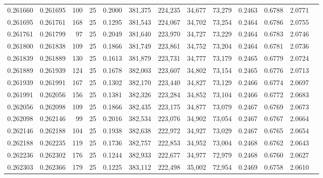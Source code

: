 \begin{tabular}{rrrrrrrrrrrrr}
0.261660 & 0.261695 &   100 &  25 &                                     0.2000 & 381,375 & 224,235 &  34,677 &  73,279 & 0.2463 & 0.6788 & 2.0771 \\
0.261695 & 0.261761 &   168 &  25 &                                     0.1295 & 381,543 & 224,067 &  34,702 &  73,254 & 0.2464 & 0.6786 & 2.0755 \\
0.261761 & 0.261799 &    97 &  25 &                                     0.2049 & 381,640 & 223,970 &  34,727 &  73,229 & 0.2464 & 0.6783 & 2.0746 \\
0.261800 & 0.261838 &   109 &  25 &                                     0.1866 & 381,749 & 223,861 &  34,752 &  73,204 & 0.2464 & 0.6781 & 2.0736 \\
0.261839 & 0.261889 &   130 &  25 &                                     0.1613 & 381,879 & 223,731 &  34,777 &  73,179 & 0.2465 & 0.6779 & 2.0724 \\
0.261889 & 0.261939 &   124 &  25 &                                     0.1678 & 382,003 & 223,607 &  34,802 &  73,154 & 0.2465 & 0.6776 & 2.0713 \\
0.261939 & 0.261991 &   167 &  25 &                                     0.1302 & 382,170 & 223,440 &  34,827 &  73,129 & 0.2466 & 0.6774 & 2.0697 \\
0.261991 & 0.262056 &   156 &  25 &                                     0.1381 & 382,326 & 223,284 &  34,852 &  73,104 & 0.2466 & 0.6772 & 2.0683 \\
0.262056 & 0.262098 &   109 &  25 &                                     0.1866 & 382,435 & 223,175 &  34,877 &  73,079 & 0.2467 & 0.6769 & 2.0673 \\
0.262098 & 0.262146 &    99 &  25 &                                     0.2016 & 382,534 & 223,076 &  34,902 &  73,054 & 0.2467 & 0.6767 & 2.0664 \\
0.262146 & 0.262188 &   104 &  25 &                                     0.1938 & 382,638 & 222,972 &  34,927 &  73,029 & 0.2467 & 0.6765 & 2.0654 \\
0.262188 & 0.262235 &   119 &  25 &                                     0.1736 & 382,757 & 222,853 &  34,952 &  73,004 & 0.2468 & 0.6762 & 2.0643 \\
0.262236 & 0.262302 &   176 &  25 &                                     0.1244 & 382,933 & 222,677 &  34,977 &  72,979 & 0.2468 & 0.6760 & 2.0627 \\
0.262303 & 0.262366 &   179 &  25 &                                     0.1225 & 383,112 & 222,498 &  35,002 &  72,954 & 0.2469 & 0.6758 & 2.0610 \\

\end{tabular}
